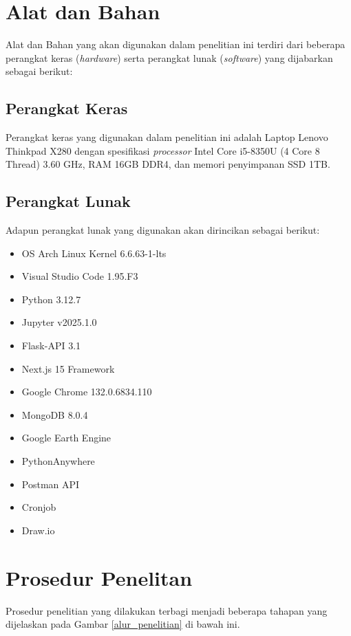 
\section{Alat dan Bahan}
Alat dan Bahan yang akan digunakan dalam penelitian ini terdiri dari beberapa perangkat keras (\textit{hardware}) serta perangkat lunak (\textit{software}) yang dijabarkan sebagai berikut: 

\subsection{Perangkat Keras}
Perangkat keras yang digunakan dalam penelitian ini adalah Laptop Lenovo Thinkpad X280 dengan spesifikasi \textit{processor} Intel Core i5-8350U (4 Core 8 Thread) 3.60 GHz, RAM 16GB DDR4, dan memori penyimpanan SSD 1TB.

\subsection{Perangkat Lunak}
Adapun perangkat lunak yang digunakan akan dirincikan sebagai berikut:

\begin{itemize}
    \item OS Arch Linux Kernel 6.6.63-1-lts
    \item Visual Studio Code 1.95.F3
    \item Python 3.12.7
    \item Jupyter v2025.1.0
    \item Flask-API 3.1
    \item Next.js 15 Framework
    \item Google Chrome 132.0.6834.110
    \item MongoDB 8.0.4
    \item Google Earth Engine
    \item PythonAnywhere
    \item Postman API
    \item Cronjob
    \item Draw.io 
\end{itemize}

\section{Prosedur Penelitan}
Prosedur penelitian yang dilakukan terbagi menjadi beberapa tahapan yang dijelaskan pada Gambar \ref{alur_penelitian} di bawah ini. 

